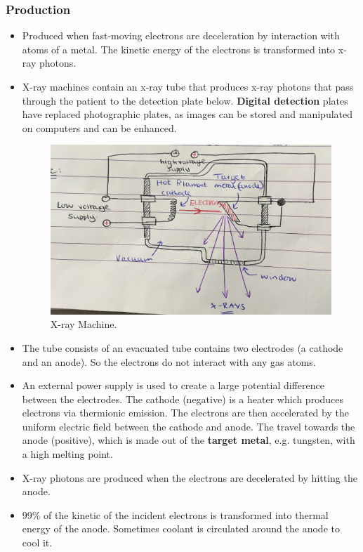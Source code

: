 \subsubsection*{Production}
\begin{itemize}
    \item Produced when fast-moving electrons are deceleration by interaction with atoms of a metal. The kinetic energy of the electrons is transformed into x-ray photons.
    \item X-ray machines contain an x-ray tube that produces x-ray photons that pass through the patient to the detection plate below. \textbf{Digital detection} plates have replaced photographic plates, as images can be stored and manipulated on computers and can be enhanced.
    \begin{figure}[h!]
        \centering
        \includegraphics[scale=0.1]{notes/images/X-Ray-1.JPG}
        \caption{X-ray Machine.}
    \end{figure}
    \FloatBarrier
    \item The tube consists of an evacuated tube contains two electrodes (a cathode and an anode). So the electrons do not interact with any gas atoms.
    \item An external power supply is used to create a large potential difference between the electrodes. The cathode (negative) is a heater which produces electrons via thermionic emission. The electrons are then accelerated by the uniform electric field between the cathode and anode. The travel towards the anode (positive), which is made out of the \textbf{target metal}, e.g. tungsten, with a high melting point. 
    \item X-ray photons are produced when the electrons are decelerated by hitting the anode.
    \item 99\% of the kinetic of the incident electrons is transformed into thermal energy of the anode. Sometimes coolant is circulated around the anode to cool it.
\end{itemize}

